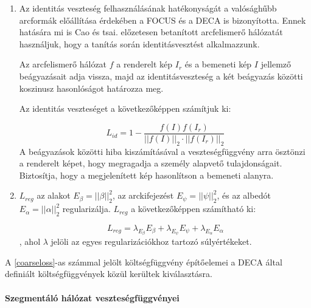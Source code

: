 \documentclass[12pt,a4]{article}
\begin{document}
\begin{enumerate}
                \item Az identitás veszteség felhasználásának hatékonyságát a valósághűbb arcformák előállítása érdekében a FOCUS és a DECA is bizonyította. Ennek hatására mi is \cite{pretrained-resnet}Cao és tsai. előzetesen betanított arcfelismerő hálózatát használjuk, hogy a tanítás során identitásvesztést alkalmazzunk.
                
                Az arcfelismerő hálózat $f$ a renderelt kép $I_{r}$ és a bemeneti kép $I$ jellemző beágyazásait adja vissza, majd az identitásveszteség a két beágyazás közötti koszinusz hasonlóságot határozza meg.

                Az identitás veszteséget a következőképpen számítjuk ki:

                \begin{equation}
                    L_{id} = 1 - \frac{f(I)f(I_{r})}{|| f(I) ||_{2} \cdot || f(I_{r}) ||_{2}}
                \end{equation}
                A beágyazások közötti hiba kiszámításával a veszteségfüggvény arra ösztönzi
                a renderelt képet, hogy megragadja a személy alapvető tulajdonságait.
                Biztosítja, hogy a megjelenített kép hasonlítson a bemeneti alanyra.
                
                \item $L_{reg}$ az alakot $E_{\beta} = ||\beta||_{2}^{2}$, az arckifejezést $E_{\psi} = ||\psi||_{2}^{2}$, és az albedót $E_{\alpha} = ||\alpha||_{2}^{2}$ regularizálja. $L_{reg}$ a következőképpen számítható ki:

                \begin{equation}
                    L_{reg} = \lambda_{E_{\beta}}E_{\beta} + \lambda_{E_{\psi}}E_{\psi} + \lambda_{E_{\alpha}}E_{\alpha} 
                \end{equation}
                , ahol $\lambda$ jelöli az egyes regularizációkhoz tartozó súlyértékeket.
                
            \end{enumerate}

            A \ref{coarseloss}-as számmal jelölt költségfüggvény építőelemei a DECA által definiált költségfüggvények közül kerültek kiválasztásra.
        
        \paragraph{Szegmentáló hálózat veszteségfüggvényei} \label{unetseg}
\end{document}

